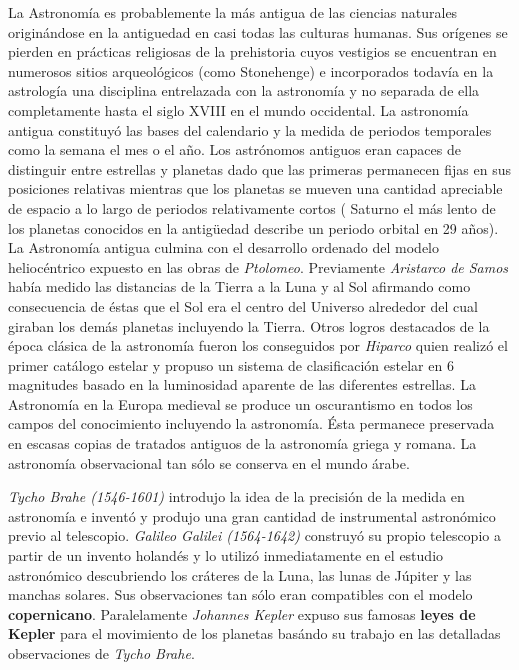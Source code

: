 \bigskip
 La Astronomía es probablemente la más antigua de las ciencias naturales originándose en la antiguedad en casi todas las culturas humanas. Sus orígenes se pierden en prácticas religiosas de la prehistoria cuyos vestigios se encuentran en numerosos sitios arqueológicos (como Stonehenge) e incorporados todavía en la astrología una disciplina entrelazada con la astronomía y no separada de ella completamente hasta el siglo XVIII en el mundo occidental. La astronomía antigua constituyó las bases del calendario y la medida de periodos temporales como la semana el mes o el año. Los astrónomos antiguos eran capaces de distinguir entre estrellas y planetas dado que las primeras permanecen fijas en sus posiciones relativas mientras que los planetas se mueven una cantidad apreciable de espacio a lo largo de periodos relativamente cortos ( Saturno el más lento de los planetas conocidos en la antigüedad describe un periodo orbital en 29 años). La Astronomía antigua culmina con el desarrollo ordenado del modelo heliocéntrico expuesto en las obras de \textit{Ptolomeo}. Previamente \textit{Aristarco de Samos} había medido las distancias de la Tierra a la Luna y al Sol afirmando como consecuencia de éstas que el Sol era el centro del Universo alrededor del cual giraban los demás planetas incluyendo la Tierra. Otros logros destacados de la época clásica de la astronomía fueron los conseguidos por \textit{Hiparco} quien realizó el primer catálogo estelar y propuso un sistema de clasificación estelar en 6 magnitudes basado en la luminosidad aparente de las diferentes estrellas. La Astronomía en la Europa medieval se produce un oscurantismo en todos los campos del conocimiento incluyendo la astronomía. Ésta permanece preservada en escasas copias de tratados antiguos de la astronomía griega y romana. La astronomía observacional tan sólo se conserva en el mundo árabe.

 \bigskip
 \textit{Tycho Brahe (1546-1601)} introdujo la idea de la precisión de la medida en astronomía e inventó y produjo una gran cantidad de instrumental astronómico previo al telescopio. \textit{Galileo Galilei (1564-1642)} construyó su propio telescopio a partir de un invento holandés y lo utilizó inmediatamente en el estudio astronómico descubriendo los cráteres de la Luna, las lunas de Júpiter y las manchas solares. Sus observaciones tan sólo eran compatibles con el modelo \textbf{copernicano}. Paralelamente \textit{Johannes Kepler} expuso sus famosas \textbf{leyes de Kepler} para el movimiento de los planetas basándo su trabajo en las detalladas observaciones de \textit{Tycho Brahe}.

